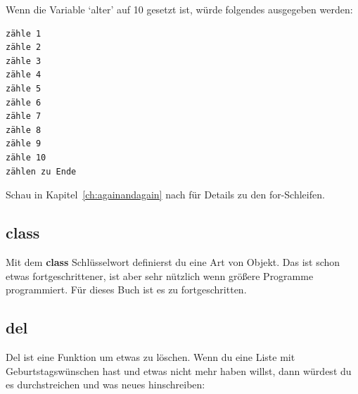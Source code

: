 \noindent
Wenn die Variable `alter' auf 10 gesetzt ist, würde folgendes ausgegeben werden:

\begin{Verbatim}[frame=single]
zähle 1
zähle 2
zähle 3
zähle 4
zähle 5
zähle 6
zähle 7
zähle 8
zähle 9
zähle 10
zählen zu Ende
\end{Verbatim}

\noindent
Schau in Kapitel~\ref{ch:againandagain} nach für Details zu den for-Schleifen.

\subsection*{class}

Mit dem \textbf{class} Schlüsselwort definierst du eine Art von Objekt. Das ist schon etwas fortgeschrittener, ist aber sehr nützlich wenn größere Programme programmiert. Für dieses Buch ist es zu fortgeschritten.

\subsection*{del}

Del ist eine Funktion um etwas zu löschen. Wenn du eine Liste mit Geburtstagswünschen hast und etwas nicht mehr haben willst, dann würdest du es durchstreichen und was neues hinschreiben:

